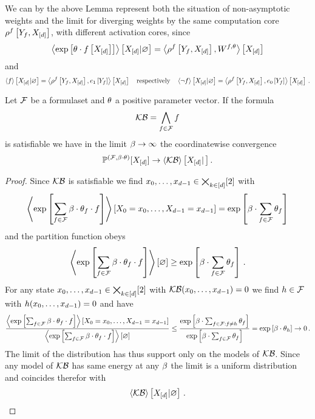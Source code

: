 We can by the above Lemma represent both the situation of non-asymptotic weights and the limit for diverging weights by the same computation core $\rho^{f}\left[Y_{f},X_{[d]}\right]$, with different activation cores, since
\begin{align*}
	\left\langle \mathrm{exp}\left[\theta\cdot f\left[X_{[d]}\right]\right]\right\rangle \left[ X_{[d]} | \varnothing \right] 
	= \left\langle \rho^{f}\left[Y_{f},X_{[d]}\right],W^{f,\theta}\right\rangle \left[ X_{[d]} \right]
\end{align*}
and 
\begin{align*}
	\left\langle f\right\rangle \left[ X_{[d]} | \varnothing \right]
	= \left\langle \rho^{f}\left[Y_{f},X_{[d]}\right],e_1\left[Y_{f}\right]\right\rangle \left[ X_{[d]} \right] \quad \text{respectively} \quad
	\left\langle \lnot f\right\rangle \left[ X_{[d]} | \varnothing \right]
	= \left\langle \rho^{f}\left[Y_{f},X_{[d]}\right],e_0\left[Y_{f}\right]\right\rangle \left[ X_{[d]} \right] \, . 
\end{align*}



\begin{theorem}
	Let $\mathcal{F}$ be a formulaset and $\theta$ a positive parameter vector.
	If the formula
		\[ \mathcal{KB} = \bigwedge_{f\in\mathcal{F}} f \]
	is satisfiable we have in the limit $\beta\rightarrow\infty$ the coordinatewise convergence
		\[ \mathbb{P}^{(\mathcal{F},\beta\cdot\theta)}[X_{[d]}] \rightarrow \left\langle \mathcal{KB}\right\rangle \left[ X_{[d]} | \, \right] . \]
\end{theorem}
\begin{proof}
	Since $\mathcal{KB}$ is satisfiable we find $x_{0},\ldots,x_{d-1}\in\bigtimes_{k\in[d]}[2]$ with
		\[  \left\langle \mathrm{exp}\left[\sum_{f\in\mathcal{F}}\beta\cdot \theta_{f} \cdot f\right]\right\rangle \left[ X_{0}=x_{0},\ldots,X_{d-1}=x_{d-1} \right] = \mathrm{exp}\left[\beta \cdot \sum_{f\in\mathcal{F}}\theta_{f}\right]  \]
	and the partition function obeys
		\[ \left\langle \mathrm{exp}\left[\sum_{f\in\mathcal{F}}\beta\cdot \theta_{f} \cdot f\right]\right\rangle \left[ \varnothing \right] \geq  \mathrm{exp}\left[\beta \cdot \sum_{f\in\mathcal{F}}\theta_{f}\right]  \, . \]
	For any state $x_{0},\ldots,x_{d-1}\in\bigtimes_{k\in[d]}[2]$ with $\mathcal{KB}(x_{0},\ldots,x_{d-1})=0$ we find $h\in\mathcal{F}$ with $h(x_{0},\ldots,x_{d-1})=0$ and have
	\begin{align*}
	 	\frac{
		\left\langle \mathrm{exp}\left[\sum_{f\in\mathcal{F}}\beta\cdot \theta_{f} \cdot f\right]\right\rangle \left[ X_{0}=x_{0},\ldots,X_{d-1}=x_{d-1} \right]
		}{
		\left\langle \mathrm{exp}\left[\sum_{f\in\mathcal{F}}\beta\cdot \theta_{f} \cdot f\right]\right\rangle \left[ \varnothing \right]
		} 
		\leq  
	 	\frac{
		\mathrm{exp}\left[\beta\cdot \sum_{f\in\mathcal{F} : f\neq h}\theta_{f}\right]
		}{
		\mathrm{exp}\left[\beta\cdot \sum_{f\in\mathcal{F}}\theta_{f}\right]
		} 
		= \mathrm{exp}\left[\beta \cdot \theta_{h}\right] \rightarrow 0 \, . 
	\end{align*}
	The limit of the distribution has thus support only on the models of $\mathcal{KB}$. 
	Since any model of $\mathcal{KB}$ has same energy at any $\beta$ the limit is a uniform distribution and coincides therefor with
		\[ \left\langle \mathcal{KB}\right\rangle \left[ X_{[d]} | \varnothing \right] \, . \]
\end{proof}


